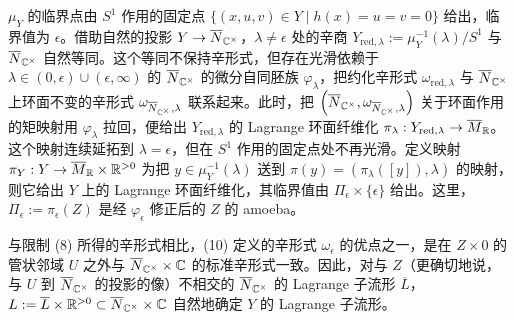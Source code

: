 $\mu_Y$ 的临界点由 $S^1$ 作用的固定点 $\{(x,u,v)\in Y\mid h(x)=u=v=0\}$ 给出，临界值为 $\epsilon$。借助自然的投影 $Y\to\overline{N}_{\mathbb{C}^\times}$，$\lambda\neq\epsilon$ 处的辛商 $Y_{\mathrm{red},\lambda}:=\mu_Y^{-1}(\lambda)/S^1$ 与 $\overline{N}_{\mathbb{C}^\times}$ 自然等同。这个等同不保持辛形式，但存在光滑依赖于 $\lambda\in(0,\epsilon)\cup(\epsilon,\infty)$ 的 $\overline{N}_{\mathbb{C}^\times}$ 的微分自同胚族 $\varphi_\lambda$，把约化辛形式 $\omega_{\mathrm{red},\lambda}$ 与 $\overline{N}_{\mathbb{C}^\times}$ 上环面不变的辛形式 $\omega_{\overline{N}_{\mathbb{C}^\times},\lambda}$ 联系起来。此时，把 $\left(\overline{N}_{\mathbb{C}^\times},\omega_{\overline{N}_{\mathbb{C}^\times},\lambda}\right)$ 关于环面作用的矩映射用 $\varphi_\lambda$ 拉回，便给出 $Y_{\mathrm{red},\lambda}$ 的 Lagrange 环面纤维化 $\pi_\lambda:Y_{\mathrm{red},\lambda}\to\overline{M}_{\mathbb{R}}$。这个映射连续延拓到 $\lambda=\epsilon$，但在 $S^1$ 作用的固定点处不再光滑。定义映射 $\pi_Y:Y\to\overline{M}_{\mathbb{R}}\times\mathbb{R}^{>0}$ 为把 $y\in\mu_Y^{-1}(\lambda)$ 送到 $\pi(y)=\left(\pi_\lambda([y]),\lambda\right)$ 的映射，则它给出 $Y$ 上的 Lagrange 环面纤维化，其临界值由 $\Pi_\epsilon\times\{\epsilon\}$ 给出。这里，$\Pi_\epsilon:=\pi_\epsilon(Z)$ 是经 $\varphi_\epsilon$ 修正后的 $Z$ 的 amoeba。

与限制 (8) 所得的辛形式相比，(10) 定义的辛形式 $\omega_\epsilon$ 的优点之一，是在 $Z\times 0$ 的管状邻域 $U$ 之外与 $\overline{N}_{\mathbb{C}^\times}\times\mathbb{C}$ 的标准辛形式一致。因此，对与 $Z$（更确切地说，与 $U$ 到 $\overline{N}_{\mathbb{C}^\times}$ 的投影的像）不相交的 $\overline{N}_{\mathbb{C}^\times}$ 的 Lagrange 子流形 $\overline{L}$，$L:=\overline{L}\times\mathbb{R}^{>0}\subset\overline{N}_{\mathbb{C}^\times}\times\mathbb{C}$ 自然地确定 $Y$ 的 Lagrange 子流形。

